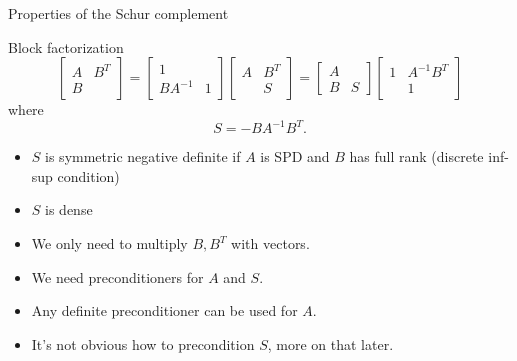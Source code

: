 \begin{frame}{Properties of the Schur complement}
  \begin{block}{Block factorization}
    \[
    \begin{bmatrix} A & B^T \\ B & \end{bmatrix} =
    \begin{bmatrix} 1 & \\ BA^{-1} & 1 \end{bmatrix}
    \begin{bmatrix} A & B^T \\ & S \end{bmatrix} =
    \begin{bmatrix} A & \\ B & S \end{bmatrix}
    \begin{bmatrix} 1 & A^{-1}B^T \\ & 1 \end{bmatrix}
    \]
    where
    \[  S = -B A^{-1} B^T . \]
  \end{block}
  \begin{itemize}
  \item $S$ is symmetric negative definite if $A$ is SPD and $B$ has full rank (discrete inf-sup condition)
  \item $S$ is dense
  \item We only need to multiply $B,B^T$ with vectors.
  \item We need preconditioners for $A$ and $S$.
  \item Any definite preconditioner can be used for $A$.
  \item It's not obvious how to precondition $S$, more on that later.
  \end{itemize}
\end{frame}
